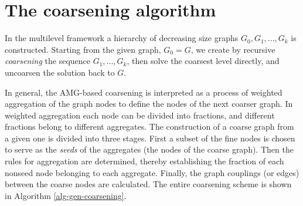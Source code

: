\documentclass[final]{siamltex}
\begin{document}
\section{The coarsening algorithm}\label{algorithm}
\par In the multilevel framework a hierarchy of decreasing size graphs
$G_0,G_1,...,G_k$ is constructed. Starting from the given graph,
$G_0 = G$, we create by recursive {\it coarsening} the sequence $G_1,...,G_k$,
then solve the coarsest level directly, and uncoarsen the
solution back to $G$.
\par In general, the AMG-based coarsening is interpreted as a process
of weighted aggregation of the graph nodes to define the nodes of
the next coarser graph. In weighted aggregation each node can be
divided into fractions, and different fractions belong to
different aggregates. The construction of a coarse graph from a
given one is divided into three stages. First a subset of the fine
nodes is chosen to serve as the {\it seeds} of the aggregates (the
nodes of the coarse graph). Then the rules for aggregation are
determined, thereby establishing the fraction of each nonseed
node belonging to each aggregate. Finally, the graph couplings
(or edges) between the coarse nodes are calculated. The entire
coarsening scheme is shown in Algorithm \ref{alg-gen-coarsening}.
\end{document}
